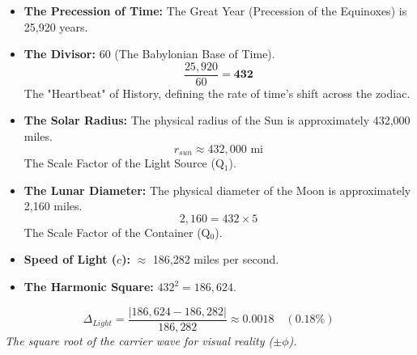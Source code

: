 \documentclass[11pt, letterpaper]{article}
\begin{document}
\begin{itemize}
    \item \textbf{The Precession of Time:} The Great Year (Precession of the Equinoxes) is 25,920 years.
    \item \textbf{The Divisor:} 60 (The Babylonian Base of Time).
    \begin{equation}
        \frac{25,920}{60} = \mathbf{432}
    \end{equation}
    The "Heartbeat" of History, defining the rate of time's shift across the zodiac.

    \item \textbf{The Solar Radius:} The physical radius of the Sun is approximately 432,000 miles.
    \begin{equation}
        r_{sun} \approx 432,000 \text{ mi}
    \end{equation}
    The Scale Factor of the Light Source (Q$_1$).

    \item \textbf{The Lunar Diameter:} The physical diameter of the Moon is approximately 2,160 miles.
    \begin{equation}
        2,160 = 432 \times 5
    \end{equation}
    The Scale Factor of the Container (Q$_0$).

    \item \textbf{Speed of Light ($c$):} $\approx$ 186,282 miles per second.
    \item \textbf{The Harmonic Square:} $432^2 = 186,624$.
\end{itemize}

\begin{equation}
    \Delta_{Light} = \frac{|186,624 - 186,282|}{186,282} \approx 0.0018 \quad (0.18\%)
\end{equation}
\textit{The square root of the carrier wave for visual reality ($\pm\phi$).}

\vspace{1em}
\begin{center}
\end{center}
\end{document}
